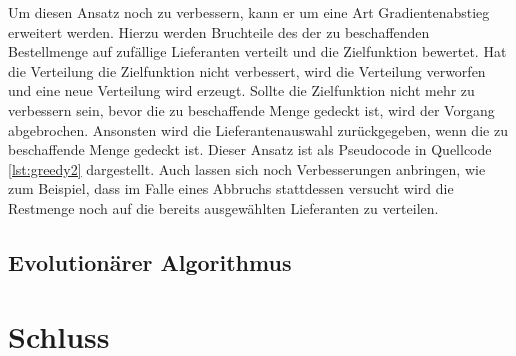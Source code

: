 Um diesen Ansatz noch zu verbessern, kann er um eine Art Gradientenabstieg erweitert werden.
Hierzu werden Bruchteile des der zu beschaffenden Bestellmenge auf zufällige Lieferanten verteilt und die Zielfunktion bewertet.
Hat die Verteilung die Zielfunktion nicht verbessert, wird die Verteilung verworfen und eine neue Verteilung wird erzeugt.
Sollte die Zielfunktion nicht mehr zu verbessern sein, bevor die zu beschaffende Menge gedeckt ist, wird der Vorgang abgebrochen.
Ansonsten wird die Lieferantenauswahl zurückgegeben, wenn die zu beschaffende Menge gedeckt ist.
Dieser Ansatz ist als Pseudocode in Quellcode \ref{lst:greedy2} dargestellt.
Auch lassen sich noch Verbesserungen anbringen, wie zum Beispiel, dass im Falle eines Abbruchs stattdessen versucht wird die Restmenge noch auf die bereits ausgewählten Lieferanten zu verteilen.

\subsection{Evolutionärer Algorithmus}\label{subsec:ea}

\section{Schluss}\label{sec:conclusion}
